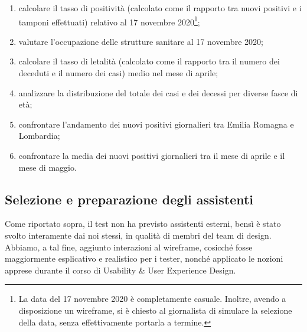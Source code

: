 \begin{enumerate}
    \item calcolare il tasso di positività (calcolato come il rapporto tra nuovi positivi e i tamponi effettuati) relativo al 17 novembre 2020\footnote{La data del 17 novembre 2020 è completamente casuale. Inoltre, avendo a disposizione un wireframe, si è chiesto al giornalista di simulare la selezione della data, senza effettivamente portarla a termine.};    
    \item valutare l'occupazione delle strutture sanitare al 17 novembre 2020;
    \item calcolare il tasso di letalità (calcolato come il rapporto tra il numero dei deceduti e il numero dei casi) medio nel mese di aprile;
    \item analizzare la distribuzione del totale dei casi e dei decessi per diverse fasce di età;
    \item confrontare l'andamento dei nuovi positivi giornalieri tra Emilia Romagna e Lombardia;
    \item confrontare la media dei nuovi positivi giornalieri tra il mese di aprile e il mese di maggio.
\end{enumerate}

\subsection{Selezione e preparazione degli assistenti}
\label{ss:vd-selezione-preparazione-assistenti}
Come riportato sopra, il test non ha previsto assistenti esterni, bensì è stato svolto interamente dai noi stessi, in qualità di membri del team di design.
Abbiamo, a tal fine, aggiunto interazioni al wireframe, cosicché fosse maggiormente esplicativo e realistico per i tester, nonché applicato le nozioni apprese durante il corso di Usability \& User Experience Design.

